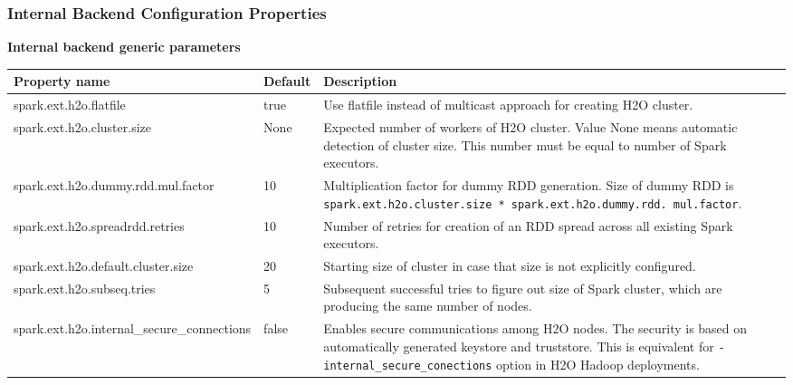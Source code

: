 \subsubsection{Internal Backend Configuration Properties}
\textbf{Internal backend generic parameters}
\begin{footnotesize}
\begin{longtable}[!ht]{l p{2.0cm} p{3.0cm}}
\toprule
Property name & Default & Description \\
\midrule

spark.ext.h2o.flatfile & true & Use flatfile instead of multicast approach for creating H2O cluster. \\ \addlinespace

spark.ext.h2o.cluster.size & None & Expected number of workers of H2O cluster. Value None means automatic detection of cluster size. This number must be equal to number of Spark executors. \\ \addlinespace

spark.ext.h2o.dummy.rdd.mul.factor & 10 & Multiplication factor for dummy RDD generation. Size of dummy RDD is \texttt{spark.ext.h2o.cluster.size * spark.ext.h2o.dummy.rdd. mul.factor}. \\ \addlinespace

spark.ext.h2o.spreadrdd.retries & 10 & Number of retries for creation of an RDD spread across all existing Spark executors. \\ \addlinespace

spark.ext.h2o.default.cluster.size & 20 & Starting size of cluster in case that size is not explicitly configured. \\ \addlinespace

spark.ext.h2o.subseq.tries & 5 & Subsequent successful tries to figure out size of Spark cluster, which are producing the same number of nodes. \\ \addlinespace

spark.ext.h2o.internal\_secure\_connections & false & Enables secure communications among H2O nodes. The security is based on automatically generated keystore and truststore. This is equivalent for \texttt{-internal\_secure\_conections} option in H2O Hadoop deployments. \\ 


\bottomrule
\end{longtable}
\end{footnotesize}

